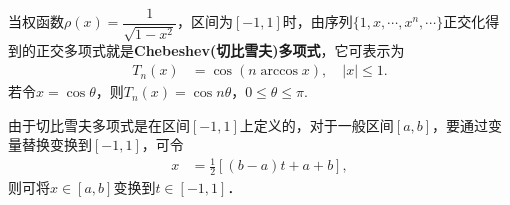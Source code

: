 \documentclass[../../main.tex]{subfiles}
\begin{document}
\begin{definition}
当权函数$\rho(x) = \dfrac{1}{\sqrt{1 - x^2}}$，区间为$[-1,1]$时，由序列$\{1,x,\cdots,x^n,\cdots\}$正交化得到的正交多项式就是\textbf{Chebeshev(切比雪夫)多项式}，它可表示为
\begin{align}\label{eq:数值分析-3-2.10}
T_n(x) &= \cos(n \arccos x),\quad |x| \leqslant 1.
\end{align}
若令$x = \cos\theta$，则$T_n(x) = \cos n\theta$，$0 \leqslant \theta \leqslant \pi$.
\end{definition}
\begin{remark}
由于切比雪夫多项式是在区间$[-1,1]$上定义的，对于一般区间$[a,b]$，要通过变量替换变换到$[-1,1]$，可令
\begin{align}\label{eq:数值分析-3-2.14}
x &= \frac{1}{2}[(b - a)t + a + b],
\end{align}
则可将$x \in [a,b]$变换到$t \in [-1,1]$．
\end{remark}
\end{document}

